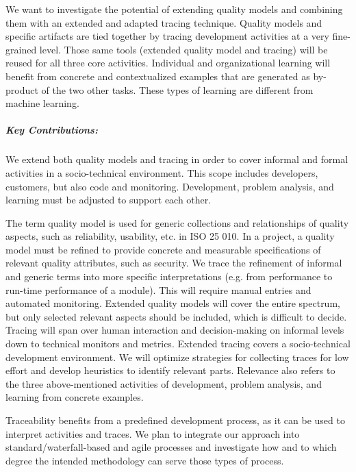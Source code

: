 We want to investigate the potential of extending quality models and combining them with an exten­ded and adapted tracing technique. Quality models and specific artifacts are tied together by tracing development activities at a very fine-grained level. Those same tools (extended quality model and tracing) will be reused for all three core activities. Individual and organizational learning will benefit from concrete and contextualized examples that are generated as by-product of the two other tasks. These types of learning are different from machine learning.

\subparagraph*{Key Contributions:}
We extend both quality models and tracing in order to cover informal and formal activities in a socio-technical environment. This scope includes developers, customers, but also code and monitoring. Development, problem analysis, and learning must be adjusted to support each other.

The term quality model is used for generic collections and relationships of quality aspects, such as reliability, usability, etc. in ISO 25 010. In a project, a quality model must be refined to provide concrete and measurable specifications of relevant quality attributes, such as security. We trace the refinement of informal and generic terms into more specific interpretations (e.g. from performance to run-time performance of a module). This will require manual entries and automated monitoring. Extended quality models will cover the entire spectrum, but only selected relevant aspects should be included, which is difficult to decide. Tracing will span over human interaction and decision-making on informal levels down to technical monitors and metrics. Extended tracing covers a socio-technical development environment. We will optimize strategies for collecting traces for low effort and develop heuristics to identify relevant parts. Relevance also refers to the three above-mentioned activities of development, problem analysis, and learning from concrete examples.

Traceability benefits from a predefined development process, as it can be used to interpret activities and traces. We plan to integrate our approach into standard/waterfall-based and agile processes and investigate how and to which degree the intended methodology can serve those types of process.


